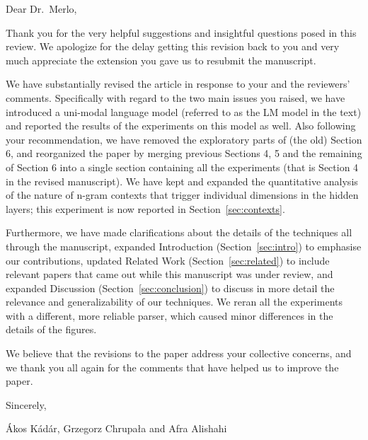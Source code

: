 \newpage
{}

\noindent
Dear Dr.~Merlo,
\newline

Thank you for the very helpful suggestions and insightful questions
posed in this review.  We apologize for the delay getting this
revision back to you and very much appreciate the extension you 
gave us to resubmit the manuscript.

We have substantially revised the article in response to your and the reviewers' 
comments. Specifically with regard to the two main issues you raised, we have 
introduced a uni-modal language model (referred to as the {\sc LM} model in the text) 
and reported the results of the experiments on this model as well. Also following 
your recommendation, we have removed the exploratory parts of (the old) Section 6, 
and reorganized the paper by merging previous Sections 4, 5 and the remaining of 
Section 6 into a single section containing all the experiments (that is Section 4 in the 
revised manuscript). We have kept and expanded the quantitative analysis of the nature of 
n-gram contexts that trigger individual dimensions in the hidden layers; this experiment is 
now reported in Section~\ref{sec:contexts}.

Furthermore, we have made clarifications about the details of the techniques all 
through the manuscript, expanded Introduction (Section~\ref{sec:intro}) to 
emphasise our contributions, updated Related Work (Section~\ref{sec:related}) 
to include relevant papers that came out while this manuscript was under review, and expanded Discussion (Section~\ref{sec:conclusion}) to discuss in more detail the relevance and generalizability of our techniques. 
We reran all the experiments with a different, more reliable parser,
which caused minor differences in the details of the figures.

We believe that the revisions to the paper address your collective
concerns, and we thank you all again for the comments that have helped
us to improve the paper.
\newline

\noindent
Sincerely,
\newline

\noindent
Ákos Kádár, Grzegorz Chrupała and Afra Alishahi
\newline


